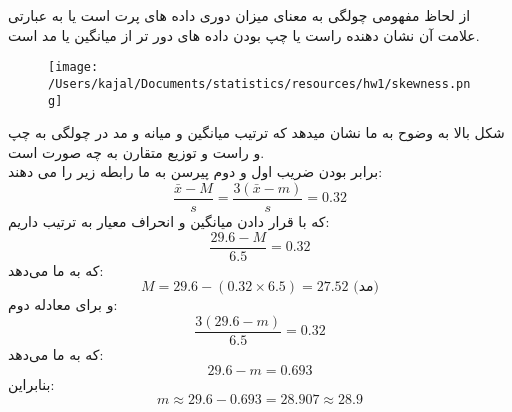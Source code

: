\problem{}
\subproblem{}
از لحاظ مفهومی چولگی به معنای میزان دوری داده های پرت است یا به عبارتی علامت آن نشان دهنده راست یا چپ بودن داده های دور تر از میانگین یا مد است.

\subproblem{}
\begin{figure}[H]
	\centering
	\texttt{[image: /Users/kajal/Documents/statistics/resources/hw1/skewness.png]}
\end{figure}
شکل بالا به وضوح به ما نشان میدهد که ترتیب میانگین و میانه و مد در چولگی به چپ و راست و توزیع متقارن به چه صورت است.
\\
\subproblem{}
برابر بودن ضریب اول و دوم پیرسن به ما رابطه زیر را می دهند:
\[
\frac{\bar{x} - M}{s} = \frac{3(\bar{x} - m)}{s} = 0.32
\]
که با قرار دادن میانگین و انحراف معیار به ترتیب داریم:
\[
\frac{29.6 - M}{6.5} = 0.32
\]
که به ما می‌دهد:
\[ M = 29.6 - (0.32 \times 6.5) = 27.52 \text{ (مد)} \]
و برای معادله دوم:
\[
\frac{3(29.6 - m)}{6.5} = 0.32
\]
که به ما می‌دهد:
\[ 29.6 - m = 0.693 \]
بنابراین:
\[ m \approx 29.6 - 0.693 = 28.907 \approx 28.9 \]

